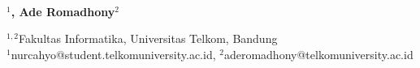  
  \begin{center}
      \textbf{\large \Title}\\
      \bigskip 
  \end{center}
  
  
  
   \begin{center}
     \bf \Author$^1$, Ade Romadhony$^2$
  \end{center}
  
  
   \begin{center}
      $^{1,2}$Fakultas Informatika, Universitas Telkom, Bandung\\
      $^1$nurcahyo@student.telkomuniversity.ac.id, $^2$aderomadhony@telkomuniversity.ac.id
  \end{center}
  
   
   
